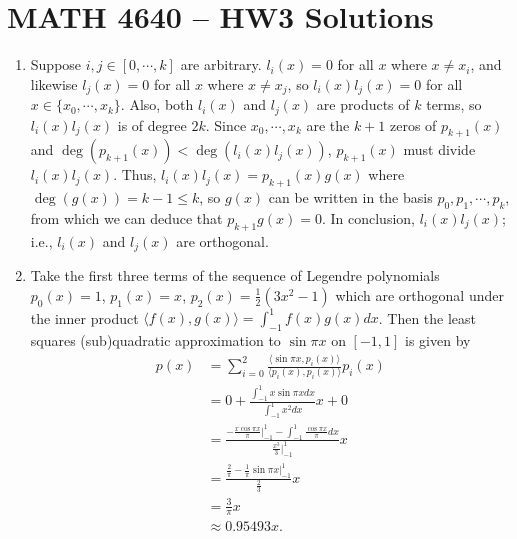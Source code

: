 \documentclass[a4paper,12pt]{article}
\newcommand{\norm}[1]{\left\lVert#1\right\rVert}
\begin{document}
\section*{MATH 4640 -- HW3 Solutions}
\begin{enumerate}
    \item
        Suppose $i, j \in [0, \cdots, k]$ are arbitrary. $l_i(x) = 0$ for all $x$ where $x \neq x_i$, and likewise $l_j(x) = 0$ for all $x$ where $x \neq x_j$, so $l_i(x) l_j(x) = 0$ for all $x \in \{ x_0, \cdots, x_k \}$. Also, both $l_i(x)$ and $l_j(x)$ are products of $k$ terms, so $l_i(x) l_j(x)$ is of degree $2k$. Since $x_0, \cdots, x_k$ are the $k + 1$ zeros of $p_{k + 1}(x)$ and $\deg(p_{k + 1}(x)) < \deg(l_i(x) l_j(x))$, $p_{k + 1}(x)$ must divide $l_i(x) l_j(x)$. Thus, $l_i(x) l_j(x) = p_{k + 1}(x) g(x)$ where $\deg(g(x)) = k - 1 \leq k$, so $g(x)$ can be written in the basis $p_0, p_1, \cdots, p_k$, from which we can deduce that $p_{k + 1} g(x) = 0$. In conclusion, $l_i(x) l_j(x)$; i.e., $l_i(x)$ and $l_j(x)$ are orthogonal.
    \item

        Take the first three terms of the sequence of Legendre polynomials $p_0(x) = 1$, $p_1(x) = x$, $p_2(x) = \frac{1}{2}(3x^2 - 1)$ which are orthogonal under the inner product $\langle f(x), g(x) \rangle = \int_{-1}^1 f(x)g(x)dx$. Then the least squares (sub)quadratic approximation to $\sin \pi x$ on $[-1, 1]$ is given by
        \begin{align*}
            p(x) &= \sum_{i = 0}^2 \frac{\langle \sin \pi x, p_i(x) \rangle}{\langle p_i(x), p_i(x) \rangle} p_i(x) \\
            &= 0 + \frac{\int_{-1}^1 x \sin\pi x dx}{\int_{-1}^1 x^2 dx}x + 0 \\
            &= \frac{-\frac{x\cos\pi x}{\pi}|_{-1}^1 - \int_{-1}^1 \frac{\cos \pi x}{\pi} dx}{\frac{x^3}{3}|_{-1}^1} x \\
            &= \frac{\frac{2}{\pi} - \frac{1}{\pi} \sin\pi x|_{-1}^1}{\frac{2}{3}} x \\
            &= \frac{3}{\pi} x \\
            &\approx 0.95493x.
        \end{align*}


\end{enumerate}
\end{document}
